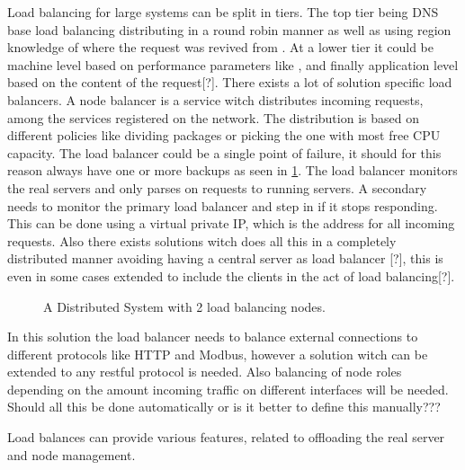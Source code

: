 Load balancing for large systems can be split in tiers.
The top tier being DNS base load balancing distributing in a round robin manner as well as using region knowledge of where the request was revived from \cite{Amazon:Route53}.
At a lower tier it could be machine level based on performance parameters like \cite{zhang2000linuxVirtualServer}, and finally application level based on the content of the request[?]. %
There exists a lot of solution specific load balancers.
A node balancer is a service witch distributes incoming requests, among the services registered on the network.
The distribution is based on different policies like dividing packages or picking the one with most free CPU capacity.
The load balancer could be a single point of failure, it should for this reason always have one or more backups as seen in \cref{fig:loadBalancingSetup}.
The load balancer monitors the real servers and only parses on requests to running servers.
A secondary needs to monitor the primary load balancer and step in if it stops responding.
This can be done using a virtual private IP, which is the address for all incoming requests. Also there exists solutions witch does all this in a completely distributed manner avoiding having a central server as load balancer [?], this is even in some cases extended to include the clients in the act of load balancing[?]. %

\begin{figure}
	\centering	
	\scalebox{0.7}{}
	\caption[Distributed System with 2 load balancing nodes]{
		\label{fig:loadBalancingSetup} 
		\footnotesize{%
			A Distributed System with 2 load balancing nodes.
		}
	}
\end{figure}

In this solution the load balancer needs to balance external connections to different protocols like HTTP and Modbus, however a solution witch can be extended to any restful protocol is needed.
Also balancing of node roles depending on the amount incoming traffic on different interfaces will be needed.
Should all this be done automatically or is it better to define this manually???

Load balances can provide various features, related to offloading the real server and node management. %

